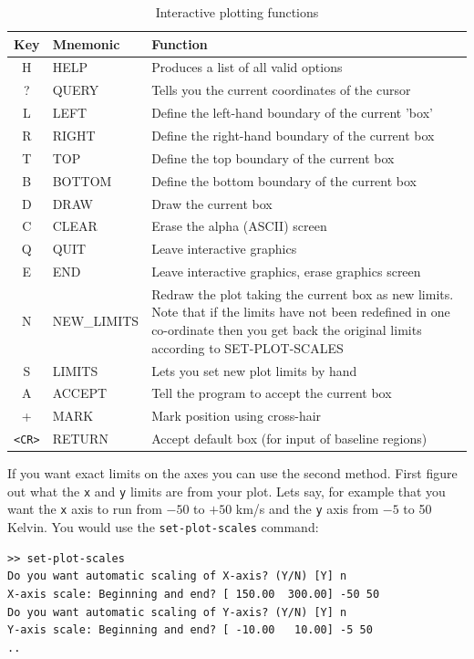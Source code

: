 \documentclass[11pt,twoside]{article}
\begin{document}
\begin{table}[htbp]
\begin{center}
\caption{Interactive plotting functions}
\begin{tabular}{|c|l|l|} \hline
Key	& Mnemonic	& Function \\ \hline
H	&HELP	&Produces a list of all valid options\\
?	&QUERY	&Tells you the current coordinates of the cursor\\
L	&LEFT	&Define the left-hand boundary of the current 'box'\\
R	&RIGHT	&Define the right-hand boundary of the current box\\
T	&TOP	&Define the top boundary of the current box\\
B	&BOTTOM	&Define the bottom boundary of the current box\\
D	&DRAW	&Draw the current box\\
C	&CLEAR	&Erase the alpha (ASCII) screen\\
Q	&QUIT	&Leave interactive graphics\\
E	&END	&Leave interactive graphics, erase graphics screen\\
N	&NEW\_LIMITS    &
    \parbox[t]{3.7in}{Redraw the plot taking the current box as new
            limits. Note that if the limits have not been
            redefined in one co-ordinate then you get back the
            original limits according to SET-PLOT-SCALES}\\
S	&LIMITS	&Lets you set new plot limits by hand\\
A	&ACCEPT	&Tell the program to accept the current box\\
+	&MARK	&Mark position using cross-hair\\
\verb+<CR>+ &RETURN &Accept default box (for input of baseline regions)\\ \hline
\end{tabular}
\label{tab:specx}
\end{center}
\end{table}


If you want exact limits on the axes you can use the second
method. First figure out what the {\tt x} and {\tt y} limits are from
your plot. Lets say, for example that you want the {\tt x} axis to run
from $-50$ to $+50$ km/s and the {\tt y} axis from $-5$ to 50 Kelvin.
You would use the {\tt set-plot-scales} command:

\begin{verbatim}
>> set-plot-scales
Do you want automatic scaling of X-axis? (Y/N) [Y] n
X-axis scale: Beginning and end? [ 150.00  300.00] -50 50
Do you want automatic scaling of Y-axis? (Y/N) [Y] n
Y-axis scale: Beginning and end? [ -10.00   10.00] -5 50
..
\end{verbatim}
\end{document}
